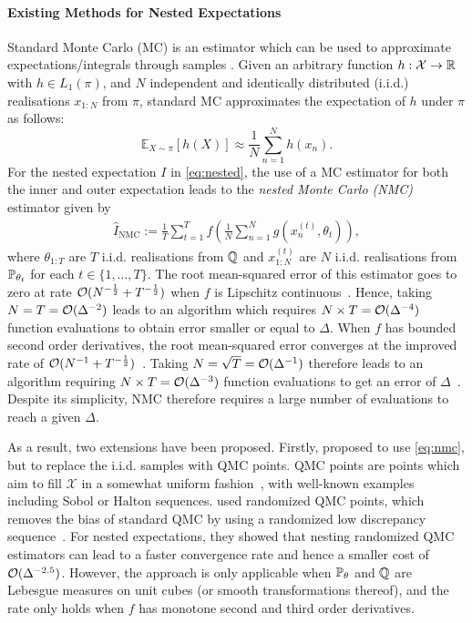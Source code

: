 \paragraph{Existing Methods for Nested Expectations}
Standard Monte Carlo (MC) is an estimator which can be used to approximate expectations/integrals through samples \citep{Robert2004}. Given an arbitrary function $h:\mathcal{X} \rightarrow \mathbb{R}$ with $h\in L_1(\pi)$, and $N$ independent and identically distributed (i.i.d.) realisations $x_{1:N}$ from $\pi$, standard MC approximates the expectation of $h$ under $\pi$ as follows:
\begin{equation*}
    \mathbb{E}_{X \sim \pi}[h(X)] \approx \frac{1}{N}\sum_{n=1}^N h(x_n). 
\end{equation*}
For the nested expectation $I$ in \eqref{eq:nested}, the use of a MC estimator for both the inner and outer expectation leads to the \emph{nested Monte Carlo (NMC)} estimator \citep{Hong2009,rainforth2018nesting} given by
\begin{align}\label{eq:nmc}
    \hat{I}_{\text{NMC}} := \frac{1}{T}\sum_{t=1}^T f\left( \frac{1}{N} \sum_{n=1}^N g(x_n^{(t)}, \theta_t) \right) ,
\end{align}
where $\theta_{1:T}$ are $T$ i.i.d. realisations from $\mathbb{Q}$ and $x_{1:N}^{(t)}$ are $N$ i.i.d. realisations from $\mathbb{P}_{\theta_t}$ for each $t \in \{1, \ldots, T\}$. 
The root mean-squared error of this estimator goes to zero at rate $\mathcal{O}(N^{-\frac{1}{2}} + T^{-\frac{1}{2}} )$ when $f$ is Lipschitz continuous~\citep{rainforth2018nesting}. 
Hence, taking $N=T=\mathcal{O}(\Delta^{-2})$ leads to an algorithm which requires $N\times T=\mathcal{O}(\Delta^{-4})$ function evaluations to obtain error smaller or equal to $\Delta$. When $f$ has bounded second order derivatives, the root mean-squared error converges at the improved rate of $\mathcal{O} (N^{-1} + T^{-\frac{1}{2}})$~\citep{rainforth2018nesting}.
Taking $N = \sqrt{T} =\mathcal{O}(\Delta^{-1})$ therefore leads to an algorithm requiring $N\times T = \mathcal{O}(\Delta^{-3})$ function evaluations to get an error of $\Delta$~\citep{Gordy2010,rainforth2018nesting}. 
Despite its simplicity, NMC therefore requires a large number of evaluations to reach a given $\Delta$. 

As a result, two extensions have been proposed. Firstly, \citet{Bartuska2023} proposed to use  \eqref{eq:nmc}, but to replace the i.i.d. samples with QMC points. 
QMC points are points which aim to fill $\mathcal{X}$ in a somewhat 
uniform fashion~\citep{Dick2013}, with well-known examples including Sobol or Halton sequences. \citet{Bartuska2023} used randomized QMC points, which removes the bias of standard QMC by using a randomized low discrepancy sequence~\citep{ owen2003quasi}. For nested expectations, they showed that nesting randomized QMC estimators can lead to a faster convergence rate and hence a smaller cost of $\mathcal{O}(\Delta^{-2.5})$. However, the approach is only applicable when $\mathbb{P}_\theta$ and $\mathbb{Q}$ are Lebesgue measures on unit cubes (or smooth transformations thereof), and the rate only holds when $f$ has monotone second and third order derivatives.

